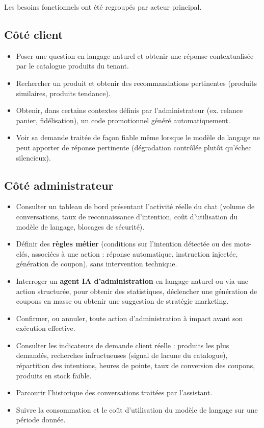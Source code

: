 Les besoins fonctionnels ont été regroupés par acteur principal.

\subsection{Côté client}

\begin{itemize}
    \item Poser une question en langage naturel et obtenir une réponse contextualisée par le catalogue produits du tenant.
    \item Rechercher un produit et obtenir des recommandations pertinentes (produits similaires, produits tendance).
    \item Obtenir, dans certains contextes définis par l'administrateur (ex. relance panier, fidélisation), un code promotionnel généré automatiquement.
    \item Voir sa demande traitée de façon fiable même lorsque le modèle de langage ne peut apporter de réponse pertinente (dégradation contrôlée plutôt qu'échec silencieux).
\end{itemize}

\subsection{Côté administrateur}

\begin{itemize}
    \item Consulter un tableau de bord présentant l'activité réelle du chat (volume de conversations, taux de reconnaissance d'intention, coût d'utilisation du modèle de langage, blocages de sécurité).
    \item Définir des \textbf{règles métier} (conditions sur l'intention détectée ou des mots-clés, associées à une action : réponse automatique, instruction injectée, génération de coupon), sans intervention technique.
    \item Interroger un \textbf{agent IA d'administration} en langage naturel ou via une action structurée, pour obtenir des statistiques, déclencher une génération de coupons en masse ou obtenir une suggestion de stratégie marketing.
    \item Confirmer, ou annuler, toute action d'administration à impact avant son exécution effective.
    \item Consulter les indicateurs de demande client réelle : produits les plus demandés, recherches infructueuses (signal de lacune du catalogue), répartition des intentions, heures de pointe, taux de conversion des coupons, produits en stock faible.
    \item Parcourir l'historique des conversations traitées par l'assistant.
    \item Suivre la consommation et le coût d'utilisation du modèle de langage sur une période donnée.
\end{itemize}

